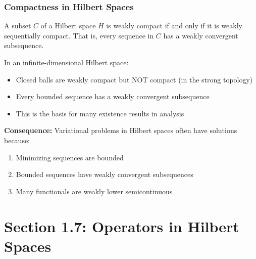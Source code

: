 \documentclass[aspectratio=169,10pt]{beamer}
\begin{document}
\begin{frame}
\frametitle{Compactness in Hilbert Spaces}

\begin{theorem}
A subset $C$ of a Hilbert space $H$ is weakly compact if and only if it is weakly sequentially compact. That is, every sequence in $C$ has a weakly convergent subsequence.
\end{theorem}

\vspace{0.3cm}

\begin{theorem}
In an infinite-dimensional Hilbert space:
\begin{itemize}
\item Closed balls are weakly compact but NOT compact (in the strong topology)
\item Every bounded sequence has a weakly convergent subsequence
\item This is the basis for many existence results in analysis
\end{itemize}
\end{theorem}

\vspace{0.3cm}

\textbf{Consequence:} Variational problems in Hilbert spaces often have solutions because:
\begin{enumerate}
\item Minimizing sequences are bounded
\item Bounded sequences have weakly convergent subsequences
\item Many functionals are weakly lower semicontinuous
\end{enumerate}
\end{frame}

\section{Section 1.7: Operators in Hilbert Spaces}
\end{document}
